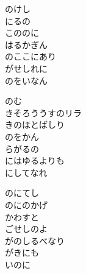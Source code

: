 \documentclass[10pt,b5j]{tarticle} %
\begin{document}
\vspace{1.5em} %
\newcommand{\linespace}{0.5em} %
\newcommand{\blocksize}{0.5\hsize} %
\begin{enumerate} %
    \begin{minipage}[c]{\blocksize}
    
        \vspace{\linespace}
        \item
        のけし\\
        にるの\\
        こののに\\
        はるかぎん\\
        のここにあり\\
        がせしれに\\
        のをいなん
        
        \vspace{\linespace}
        \item
        のむ\\
        きそろううすのリラ\\
        きのほとばしり\\
        のをかん\\
        らがるの\\
        にはゆるよりも\\
        にしてなれ
        
        \vspace{\linespace}
        \item
        のにてし\\
        のにのかげ\\
        かわすと\\
        ごせしのよ\\
        がのしるべなり\\
        がきにも\\
        いのに
    
    \end{minipage}
\end{enumerate} %
\end{document}
